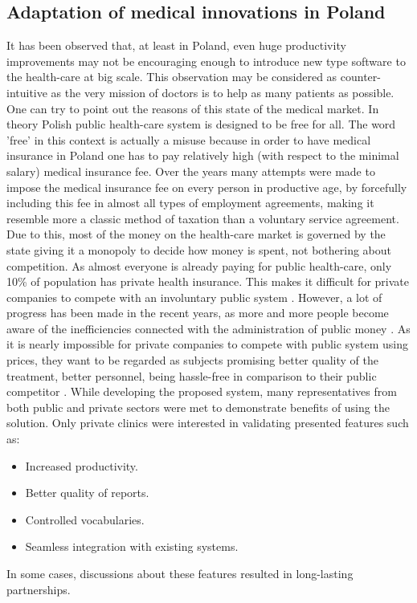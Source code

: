 \documentclass[12pt, twoside, openany]{report}
\theoremstyle{definition}
\begin{document}
\subsection{Adaptation of medical innovations in Poland}
It has been observed that, at least in Poland, even huge productivity improvements may not be encouraging enough to introduce new type software to the health-care at big scale. This observation may be considered as counter-intuitive as the very mission of doctors is to help as many patients as possible. One can try to point out the reasons of this state of the medical market. 	
In theory Polish public health-care system is designed to be free for all. The word 'free' in this context is actually a misuse because in order to have medical insurance in Poland one has to pay relatively high (with respect to the minimal salary) medical insurance fee. Over the years many attempts were made to impose the medical insurance fee on every person in  productive age, by forcefully including this fee in almost all types of employment agreements, making it resemble more a classic method of taxation than a voluntary service agreement. Due to this, most of the money on the health-care market is governed by the state giving it a monopoly to decide how money is spent, not bothering about competition. As almost everyone is already paying for public health-care, only 10\% of population has private health insurance. This makes it difficult for private companies to compete with an involuntary public system \cite{nfz}. However, a lot of progress has been made in the recent years, as more and more people become aware of the inefficiencies connected with the administration of public money \cite{inefficient}. As it is nearly impossible for private companies to compete with public system using prices, they want to be regarded as subjects promising better quality of the treatment, better personnel, being hassle-free in comparison to their public competitor \cite{private-better}. 
While developing the proposed system, many representatives from both public and private sectors were met to demonstrate benefits of using the solution. Only private clinics were interested in validating presented features such as:
\begin{itemize}
\item Increased productivity.
\item Better quality of reports.
\item Controlled vocabularies.
\item Seamless integration with existing systems.
\end{itemize}
In some cases, discussions about these features resulted in long-lasting partnerships.
\end{document}
